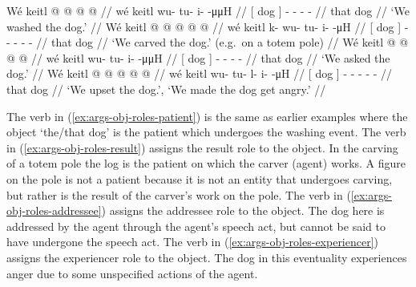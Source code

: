 \pex\label{exx:args-obj-roles}%
\a\label{ex:args-obj-roles-patient}%
%
\begingl
	\gla	{} Wé keitl {}  @ {} @ {} @ {} @ {} //
	\glb	{} wé keitl {} wu- tu- i-  -μμH //
	\glc	{}[  dog {}] - - -  - //
	\gld	{} that dog {}  {} {} {} {} //
	\glft	‘We washed the dog.’
		//
\endgl
\a\label{ex:args-obj-roles-result}%
%
\begingl
	\gla	{} Wé keitl {}  @ {} @ {} @ {} @ {} @ {} //
	\glb	{} wé keitl {} k- wu- tu- i-  -μH //
	\glc	{}[  dog {}] - - - -  - //
	\gld	{} that dog {}  {} {} {} {} {} //
	\glft	‘We carved the dog.’ (e.g.\ on a totem pole)
		//
\endgl
\a\label{ex:args-obj-roles-addressee}%
%
\begingl
	\gla	{} Wé keitl {}  @ {} @ {} @ {} @ {} //
	\glb	{} wé keitl {} wu- tu- i-  -μμH //
	\glc	{}[  dog {}] - - -  - //
	\gld	{} that dog {}  {} {} {} {} //
	\glft	‘We asked the dog.’
		//
\endgl
\a\label{ex:args-obj-roles-experiencer}%
%
\begingl
	\gla	{} Wé keitl {}  @ {} @ {} @ {} @ {} @ {} //
	\glb	{} wé keitl {} wu- tu- l- i-  -μH //
	\glc	{}[  dog {}] - - - -  - //
	\gld	{} that dog {}  {} {} {} {} {} //
	\glft	‘We upset the dog.’, ‘We made the dog get angry.’
		//
\endgl
\xe

The verb in (\ref{ex:args-obj-roles-patient}) is the same as earlier examples where the object  ‘the/that dog’ is the patient which undergoes the washing event. The verb in (\ref{ex:args-obj-roles-result}) assigns the result role to the object. In the carving of a totem pole the log is the patient on which the carver (agent) works. A figure on the pole is not a patient because it is not an entity that undergoes carving, but rather is the result of the carver’s work on the pole. The verb in (\ref{ex:args-obj-roles-addressee}) assigns the addressee role to the object. The dog here is addressed by the agent through the agent’s speech act, but cannot be said to have undergone the speech act. The verb in (\ref{ex:args-obj-roles-experiencer}) assigns the experiencer role to the object. The dog in this eventuality experiences anger due to some unspecified actions of the agent.

